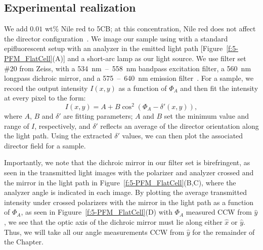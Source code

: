 \subsection{Experimental realization}
We add $0.01$ wt\% Nile red to 5CB; at this concentration, Nile red does not affect the director configuration~\cite{RN173}.
We image our sample using with a standard epifluorescent setup with an analyzer in the emitted light path [Figure~\ref{f:5-PFM_FlatCell}(A)] and a short-arc lamp as our light source.
We use filter set \#20 from Zeiss, with a 534~nm~--~558~nm bandpass excitation filter, a 560~nm longpass dichroic mirror, and a 575~--~640~nm emission filter~\cite{RN288}.
For a sample, we record the output intensity $I(x,y)$ as a function of $\Phi_A$ and then fit the intensity at every pixel to the form:
\begin{equation}
    I(x,y) = A + B \cos^2{(\Phi_A-\delta'(x,y))},\label{e:5-IntFit}
\end{equation}
where $A$, $B$ and $\delta'$ are fitting parameters; $A$ and $B$ set the minimum value and range of $I$, respectively, and $\delta'$ reflects an average of the director orientation along the light path.
Using the extracted $\delta'$ values, we can then plot the associated director field for a sample.

Importantly, we note that the dichroic mirror in our filter set is birefringent, as seen in the transmitted light images with the polarizer and analyzer crossed and the mirror in the light path in Figure~\ref{f:5-PFM_FlatCell}(B,C), where the analyzer angle is indicated in each image.
By plotting the average transmitted intensity under crossed polarizers with the mirror in the light path as a function of $\Phi_A$, as seen in Figuure~\ref{f:5-PFM_FlatCell}(D) with $\Phi_A$ measured CCW from $\hat{y}$, we see that the optic axis of the dichroic mirror must lie along either $\hat{x}$ or $\hat{y}$.
Thus, we will take all our angle measurements CCW from $\hat{y}$ for the remainder of the Chapter.

